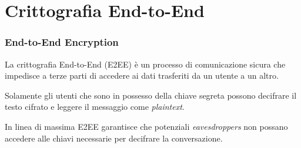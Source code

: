 \section{Crittografia End-to-End}
\begin{frame}
    \frametitle{End-to-End Encryption}
    La crittografia End-to-End (E2EE) è un processo di comunicazione sicura che impedisce a terze parti di accedere ai dati trasferiti da un utente a un altro.\newline\pause
    
    Solamente gli utenti che sono in possesso della chiave segreta possono decifrare il testo cifrato e leggere il messaggio come \textit{plaintext}.\newline\pause

    In linea di massima E2EE garantisce che potenziali \textit{eavesdroppers} non possano accedere alle chiavi necessarie per decifrare la conversazione. 
    \cite{greenberg}


\end{frame}

